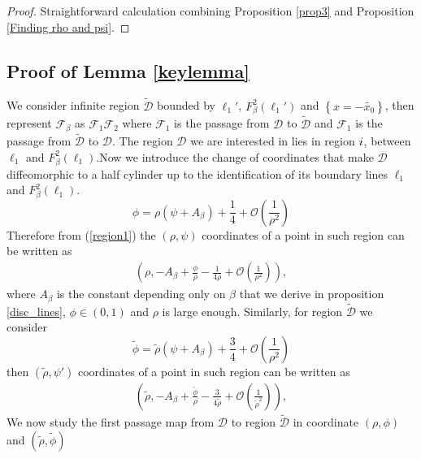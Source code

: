 \documentclass{article}
\def \Rone{\uppercase\expandafter{\romannumeral1}}
\numberwithin{figure}{section}
\numberwithin{equation}{section}
\theoremstyle{remark}
\theoremstyle{definition}
\begin{document}
\begin{proof}
	Straightforward calculation combining Proposition \ref{prop3} and Proposition \ref{Finding rho and psi}.
\end{proof}
\subsection{Proof of Lemma \ref{keylemma}}
We consider infinite region $\widetilde{\mathcal{D}}$ bounded by $\ell_1'$, $F_\beta^2(\ell_1')$ and $\left\{x=-\widetilde{x_0}\right\}$, then represent $\mathcal{F}_\beta$ as $\mathcal{F}_1\mathcal{F}_2$ where $\mathcal{F}_1$ is the passage from $\mathcal{D}$ to $\widetilde{\mathcal{D}}$ and $\mathcal{F}_1$ is the passage from $\widetilde{\mathcal{D}}$ to $\mathcal{D}$. The region $\mathcal{D}$ we are interested in lies in region $\Rone$, between $\ell_1$ and $F_\beta^2(\ell_1)$.Now we introduce the change of coordinates that make $\mathcal{D}$ diffeomorphic to a half cylinder up to the identification of its boundary lines $\ell_1$ and $F_\beta^2(\ell_1)$. 
$$\phi=\rho(\psi+A_\beta)+\frac{1}{4}+\mathcal{O}\left(\frac{1}{\rho^2}\right)$$
Therefore from (\ref{region1}) the  $(\rho,\psi)$ coordinates of a point in such region can be written as
\begin{align*}
	\left(\rho, -A_\beta+\frac{\phi}{\rho}-\frac{1}{4\rho}+\mathcal{O}\left(\frac{1}{\rho^2}\right)\right),
\end{align*}
where $A_\beta$ is the constant depending only on $\beta$ that we derive in proposition \ref*{disc_lines}, $\phi \in (0,1)$ and $\rho$ is large enough. Similarly, for region $\widetilde{\mathcal{D}}$ we consider
$$\widetilde{\phi}=\widetilde{\rho}(\psi+A_\beta)+\frac{3}{4}+\mathcal{O}\left(\frac{1}{\rho^2}\right)$$
then  $(\widetilde{\rho},\psi')$ coordinates of a point in such region can be written as
\begin{align*}
	\left(\widetilde{\rho}, -A_\beta+\frac{\widetilde{\phi}}{\rho}-\frac{3}{4\widetilde{\rho}}+\mathcal{O}\left(\frac{1}{\widetilde{\rho}^2}\right)\right),
\end{align*}
We now study the first passage map from $\mathcal{D}$  to region $\widetilde{\mathcal{D}}$ in coordinate $(\rho, \phi)$ and $(\widetilde{\rho},\widetilde{\phi})$
\end{document}

